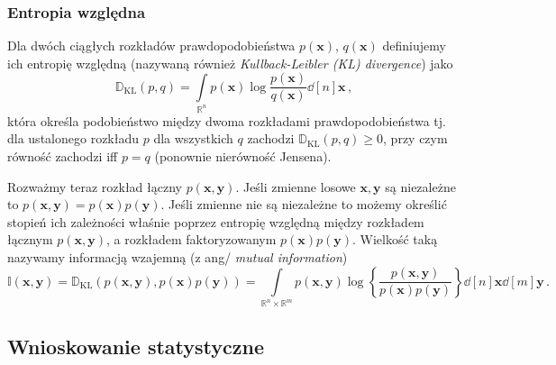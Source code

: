 \documentclass{myclass}
\begin{document}
\subsubsection{Entropia względna}
Dla dwóch ciągłych rozkładów prawdopodobieństwa \(p(\mathbf{x})\), \(q(\mathbf{x})\) definiujemy ich
entropię względną (nazywaną również \textit{Kullback-Leibler (KL) divergence}) jako
\begin{equation*}
    \mathbb{D}_\text{KL}(p , q) = \int\limits_{\mathbb{R}^n} p(\mathbf{x})\log\frac{p(\mathbf{x})}{q(\mathbf{x})} \dd[n]{\mathbf{x}}\,,
\end{equation*}
która określa podobieństwo między dwoma rozkładami prawdopodobieństwa tj. dla ustalonego rozkładu
\(p\) dla wszystkich \(q\) zachodzi \(\mathbb{D}_\text{KL}(p,q) \geq 0\), przy czym równość zachodzi
iff \(p = q\) (ponownie nierówność Jensena).

Rozważmy teraz rozkład łączny \(p(\mathbf{x}, \mathbf{y})\). Jeśli zmienne losowe \(\mathbf{x},
\mathbf{y}\) są niezależne to \(p(\mathbf{x}, \mathbf{y}) = p(\mathbf{x}) p(\mathbf{y})\). Jeśli
zmienne nie są niezależne to możemy określić stopień ich zależności właśnie poprzez entropię
względną między rozkładem łącznym \(p(\mathbf{x}, \mathbf{y})\), a rozkładem faktoryzowanym
\(p(\mathbf{x})p(\mathbf{y})\). Wielkość taką nazywamy informacją wzajemną (z ang/ \textit{mutual
information})
\begin{equation*}
    \mathbb{I}(\mathbf{x} , \mathbf{y}) = \mathbb{D}_\text{KL}(p(\mathbf{x}, \mathbf{y}), p(\mathbf{x})p(\mathbf{y})) = \int\limits_{\mathbb{R}^n\times\mathbb{R}^m} p(\mathbf{x}, \mathbf{y})\log\left\{\frac{p(\mathbf{x}, \mathbf{y})}{p(\mathbf{x})p(\mathbf{y})}\right\} \dd[n]{\mathbf{x}} \dd[m]{\mathbf{y}}\,.
\end{equation*}

\subsection{Wnioskowanie statystyczne}
\end{document}
